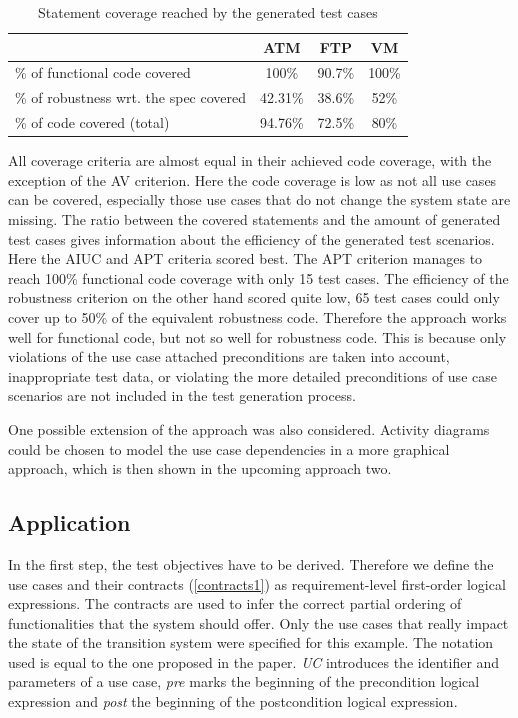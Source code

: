 \begin{table}[h] 
	\centering
	\begin{small}
		\caption{Statement coverage reached by the generated test cases}
		\label{codecoverage}
		\setlength{\tabcolsep}{1em}
		\begin{tabular}{l|c|c|c}
			\hline
			& \textbf{ATM} & \textbf{FTP} & \textbf{VM} \\
			\hline
			\hline	
			\% of functional code covered & 100\% & 90.7\% & 100\% \\
			\hline
			\% of robustness wrt. the spec covered & 42.31\% & 38.6\% & 52\% \\
			\hline
			\% of code covered (total) & 94.76\% & 72.5\% & 80\% \\
			\hline
		\end{tabular}
	\end{small}
\end{table}

All coverage criteria are almost equal in their achieved code coverage, with the exception of the AV criterion. Here the code coverage is low as not all use cases can be covered, especially those use cases that do not change the system state are missing. The ratio between the covered statements and the amount of generated test cases gives information about the efficiency of the generated test scenarios. Here the AIUC and APT criteria scored best. The APT criterion manages to reach 100\% functional code coverage with only 15 test cases. The efficiency of the robustness criterion on the other hand scored quite low, 65 test cases could only cover up to 50\% of the equivalent robustness code. Therefore the approach works well for functional code, but not so well for robustness code. This is because only violations of the use case attached preconditions are taken into account, inappropriate test data, or violating the more detailed preconditions of use case scenarios are not included in the test generation process. 

One possible extension of the approach was also considered. Activity diagrams could be chosen to model the use case dependencies in a more graphical approach, which is then shown in the upcoming approach two. 

\subsection{Application}

In the first step, the test objectives have to be derived. Therefore we define the use cases and their contracts (\autoref{contracts1}) as requirement-level first-order logical expressions. The contracts are used to infer the correct partial ordering of functionalities that the system should offer. Only the use cases that really impact the state of the transition system were specified for this example. The notation used is equal to the one proposed in the paper. \textit{UC} introduces the identifier and parameters of a use case, \textit{pre} marks the beginning of the precondition logical expression and \textit{post} the beginning of the postcondition logical expression. 

